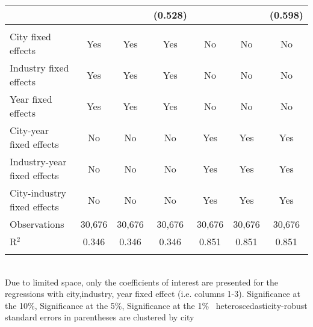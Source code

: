 \documentclass[12pt]{article}
\begin{document}
\begin{table}[!htbp]
\begin{adjustbox}{width=\textwidth, totalheight=\baselineskip,keepaspectratio}
\begin{tabular}{@{\extracolsep{5pt}}lcccccc}
  &  &  & (0.528) &  &  & (0.598) \\ 
 \hline \\[-1.8ex] 
City fixed effects & Yes & Yes & Yes & No & No & No \\ 
Industry fixed effects & Yes & Yes & Yes & No & No & No \\ 
Year fixed effects & Yes & Yes & Yes & No & No & No \\ 
City-year fixed effects & No & No & No & Yes & Yes & Yes \\ 
Industry-year fixed effects & No & No & No & Yes & Yes & Yes \\ 
City-industry fixed effects & No & No & No & Yes & Yes & Yes \\ 
Observations & 30,676 & 30,676 & 30,676 & 30,676 & 30,676 & 30,676 \\ 
R$^{2}$ & 0.346 & 0.346 & 0.346 & 0.851 & 0.851 & 0.851 \\ 
\hline 
\hline \\[-1.8ex] 
\end{tabular}
\end{adjustbox}
\begin{tablenotes} 
 \small 
 \item \\ 
\footnotesize{
Due to limited space, only the coefficients of interest are presented 
for the regressions with city,industry, year fixed effect (i.e. columns 1-3).
\sym{*} Significance at the 10\%, \sym{**} Significance at the 5\%, \sym{***} Significance at the 1\% \
heteroscedasticity-robust standard errors in parentheses are clustered by city 
}
 
\end{tablenotes}
\end{table}
\end{document}
